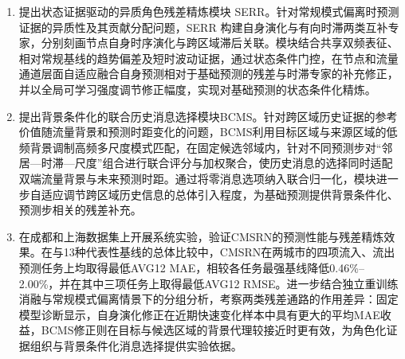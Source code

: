 \begin{enumerate}
	\def\labelenumi{\arabic{enumi}.}
	\item
	提出状态证据驱动的异质角色残差精炼模块 SERR。针对常规模式偏离时预测证据的异质性及其贡献分配问题，SERR 构建自身演化与有向时滞两类互补专家，分别刻画节点自身时序演化与跨区域滞后关联。模块结合共享双频表征、相对常规基线的趋势偏差及短时波动证据，通过状态条件门控，在节点和流量通道层面自适应融合自身预测相对于基础预测的残差与时滞专家的补充修正，并以全局可学习强度调节修正幅度，实现对基础预测的状态条件化精炼。
	\item
	提出背景条件化的联合历史消息选择模块BCMS。针对跨区域历史证据的参考价值随流量背景和预测时距变化的问题，BCMS利用目标区域与来源区域的低频背景调制高频多尺度模式匹配，在固定候选邻域内，针对不同预测步对“邻居---时滞---尺度”组合进行联合评分与加权聚合，使历史消息的选择同时适配双端流量背景与未来预测时距。通过将零消息选项纳入联合归一化，模块进一步自适应调节跨区域历史信息的总体引入程度，为基础预测提供背景条件化、预测步相关的残差补充。
	\item
	在成都和上海数据集上开展系统实验，验证CMSRN的预测性能与残差精炼效果。在与13种代表性基线的总体比较中，CMSRN在两城市的四项流入、流出预测任务上均取得最低AVG12 MAE，相较各任务最强基线降低0.46\%--2.00\%，并在其中三项任务上取得最低AVG12 RMSE。进一步结合独立重训练消融与常规模式偏离情景下的分组分析，考察两类残差通路的作用差异：固定模型诊断显示，自身演化修正在近期快速变化样本中具有更大的平均MAE收益，BCMS修正则在目标与候选区域的背景代理较接近时更有效，为角色化证据组织与背景条件化消息选择提供实验依据。
\end{enumerate}
